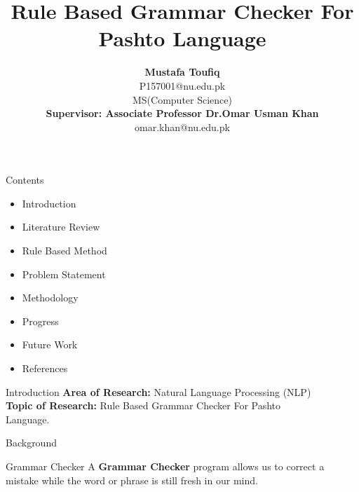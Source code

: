 \documentclass{beamer}
\title{Rule Based Grammar Checker For Pashto Language} \vspace{1em}
\author[1]{\textbf {Mustafa Toufiq} \\ P157001@nu.edu.pk \\ \vspace{1.5em} MS(Computer Science)\\ \vspace{1.5em} \textbf{Supervisor: Associate Professor Dr.Omar Usman Khan}\\ omar.khan@nu.edu.pk}
\institute{\textbf{National University of Computer and Emerging Sciences}}
\begin{document}
\thispagestyle{empty}
\setcounter{page}{1}
\newpage


\newcommand{\seti}{\setcounter{saveenumi}{\value{enumi}}}
\newcommand{\conti}{\setcounter{enumi}{\value{saveenumi}}}


	
\begin{frame}
\titlepage
\end{frame}


\begin{frame}{Contents}
\begin{itemize}
\item Introduction
\vspace{0.3em}
\item Literature Review
\vspace{0.3em}
\item Rule Based Method
\vspace{0.3em}
\item Problem Statement
\vspace{0.3em}
\item Methodology
\vspace{0.3em}
\item Progress
\vspace{0.3em}
\item Future Work
\vspace{0.3em}
\item References
\end{itemize}
\end{frame}


\begin{frame}{Introduction}
\textbf{Area of Research:} Natural Language Processing (NLP) \\
\vspace{1em}
\textbf{Topic of Research:} Rule Based Grammar Checker For Pashto \\ \vspace{0.2em} \hspace{3.3cm} Language.
\end{frame}


\begin{frame}{Background}
\begin{block}{Grammar Checker}
\vspace{0.5em}
A \textbf {Grammar Checker} program allows us to correct a mistake while the
word or phrase is still fresh in our mind.
\vspace{0.5em}	
\end{block}
\end{frame}
\end{document}
